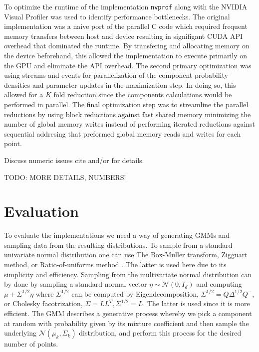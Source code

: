 \documentclass{article}
\begin{document}
To optimize the runtime of the implementation \texttt{nvprof} along with the NVIDIA Visual Profiler was used to identify performance bottlenecks. The original implementation was a naive port of the parallel C code which required frequent memory transfers between host and device resulting in signifigant CUDA API overhead that dominated the runtime. By transfering and allocating memory on the device beforehand, this allowed the implementation to execute primarily on the GPU and eliminate the API overhead. The second primary optimization was using streams and events for parallelization of the component probability densities and parameter updates in the maximization step. In doing so, this allowed for a $K$ fold reduction since the components calculations would be performed in parallel. The final optimization step was to streamline the parallel reductions by using block reductions against fast shared memory minimizing the number of global memory writes instead of performing iterated reductions against sequential addresing that preformed global memory reads and writes for each point.

Discuss numeric issues cite \cite{collange2015numerical} and/or \cite{whitehead2011precision} for details.

TODO: MORE DETAILS, NUMBERS!

\section{Evaluation}

To evaluate the implementations we need a way of generating GMMs and sampling data from the resulting distributions. To sample from a standard univariate normal distribution one can use The Box-Muller transform, Zigguart method, or Ratio-of-uniforms method \cite{kinderman1977computer}. The latter is used here due to its simplicity and efficiency. Sampling from the multivariate normal distribution can by done by sampling a standard normal vector $\eta \sim \mathcal{N}(0 ,I_d)$ and computing $\mu + \Sigma^{1/2} \eta$ where $\Sigma^{1/2}$ can be computed by Eigendecomposition, $\Sigma^{1/2} = Q \Delta^{1/2} Q^{-}$, or Cholesky facotrization, $\Sigma = L L^T, \Sigma^{1/2} = L$. The latter is used since it is more efficient. The GMM describes a generative process whereby we pick a component at random with probability given by its mixture coefficient and then sample the underlying $\mathcal{N}(\mu_k, \Sigma_k)$ distribution, and perform this process for the desired number of points.
\end{document}
